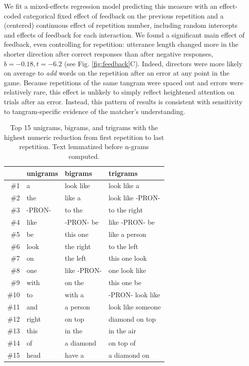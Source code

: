 \documentclass[alpha-refs]{wiley-article}
\begin{document}
We fit a mixed-effects regression model predicting this measure with an effect-coded categorical fixed effect of feedback on the previous repetition and a (centered) continuous effect of repetition number, including random intercepts and effects of feedback for each interaction.
We found a significant main effect of feedback, even controlling for repetition: utterance length changed more in the shorter direction after correct responses than after negative responses, $b = -0.18, t = -6.2$ (see Fig. \ref{fig:feedback}C).
Indeed, directors were more likely on average to \emph{add} words on the repetition after an error at any point in the game.
Because repetitions of the same tangram were spaced out and errors were relatively rare, this effect is unlikely to simply reflect heightened attention on trials after an error.
Instead, this pattern of results is consistent with sensitivity to tangram-specific evidence of the matcher's understanding.


\begin{table}[t]
\centering
\begin{tabular}{|r||l|l|l|}
  \hline
 & unigrams & bigrams & trigrams \\ 
  \hline
\#1 & a & look like & look like a \\ 
  \#2 & the & like a & look like -PRON- \\ 
  \#3 & -PRON- & to the & to the right \\ 
  \#4 & like & -PRON- be & like -PRON- be \\ 
  \#5 & be & this one & like a person \\ 
  \#6 & look & the right & to the left \\ 
  \#7 & on & the left & this one look \\ 
  \#8 & one & like -PRON- & one look like \\ 
  \#9 & with & on the & this one be \\ 
  \#10 & to & with a & -PRON- look like \\ 
  \#11 & and & a person & look like someone \\ 
  \#12 & right & on top & diamond on top \\ 
  \#13 & this & in the & in the air \\ 
  \#14 & of & a diamond & on top of \\ 
  \#15 & head & have a & a diamond on \\ 
   \hline
\end{tabular}
\caption{Top 15 unigrams, bigrams, and trigrams with the highest numeric reduction from first repetition to last repetition. Text lemmatized before n-grams computed. } 
\label{tab:words}
\end{table}
\end{document}
